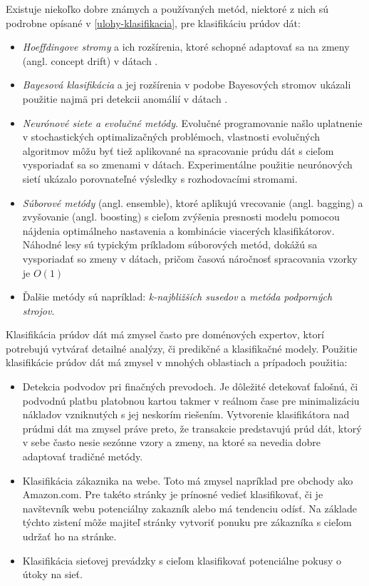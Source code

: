 Existuje niekoľko dobre známych a používaných metód, niektoré z nich sú podrobne opísané v \ref{ulohy-klasifikacia}, pre klasifikáciu prúdov dát:
\begin{itemize}
	\item \textit{Hoeffdingove stromy} a ich rozšírenia, ktoré schopné adaptovať sa na zmeny (angl. concept drift) v dátach \citep{hulten2001mining, bifet2009adaptive}.
	\item \textit{Bayesová klasifikácia} a jej rozšírenia v podobe Bayesových stromov ukázali použitie najmä pri detekcii anomálií v dátach \citep{hill2007real}.
	\item \textit{Neurónové siete a evolučné metódy}. Evolučné programovanie našlo uplatnenie v stochastických optimalizačných problémoch, vlastnosti evolučných algoritmov môžu byť tiež aplikované na spracovanie prúdu dát s cieľom vysporiadať sa so zmenami v dátach. Experimentálne použitie neurónových sietí ukázalo porovnateľné výsledky s rozhodovacími stromami.
	\item \textit{Súborové metódy} (angl. ensemble), ktoré aplikujú vrecovanie (angl. bagging) a zvyšovanie (angl. boosting) s cieľom zvýšenia presnosti modelu pomocou nájdenia optimálneho nastavenia a kombinácie viacerých klasifikátorov. Náhodné lesy sú typickým príkladom súborových metód, dokážú sa vysporiadať so zmeny v dátach, pričom časová náročnosť spracovania vzorky je $O(1)$ %
	\item Ďalšie metódy sú napríklad: \textit{k-najbližších susedov} a \textit{metóda podporných strojov}.
\end{itemize}

Klasifikácia prúdov dát má zmysel často pre doménových expertov, ktorí potrebujú vytvárať detailné analýzy, či predikčné a klasifikačné modely. Použitie klasifikácie prúdov dát má zmysel v mnohých oblastiach a prípadoch použitia:

\begin{itemize}
	\item Detekcia podvodov pri finačných prevodoch. Je dôležité detekovať falošnú, či podvodnú platbu platobnou kartou takmer v reálnom čase pre minimalizáciu nákladov vzniknutých s jej neskorím riešením. Vytvorenie klasifikátora nad prúdmi dát ma zmysel práve preto, že transakcie predstavujú prúd dát, ktorý v sebe často nesie sezónne vzory a zmeny, na ktoré sa nevedia dobre adaptovať tradičné metódy.
	\item Klasifikácia zákaznika na webe. Toto má zmysel napríklad pre obchody ako Amazon.com. Pre takéto stránky je prínosné vedieť klasifikovať, či je navštevník webu potenciálny zakazník alebo má tendenciu odísť. Na základe týchto zistení môže majiteľ stránky vytvoriť ponuku pre zákazníka s cieľom udržať ho na stránke.
	\item Klasifikácia sieťovej prevádzky s cieľom klasifikovať potenciálne pokusy o útoky na sieť.
\end{itemize}

